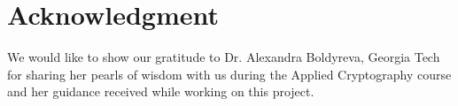 \documentclass[conference]{IEEEtran}
\begin{document}


\section*{Acknowledgment}

We would like to show our gratitude to Dr. Alexandra Boldyreva, Georgia Tech for sharing her pearls of wisdom with us during the Applied Cryptography course and her guidance received while working on this project.








%
%
%

\end{document}
